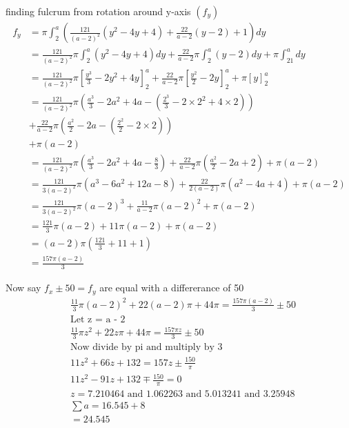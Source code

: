 \documentclass{article}
\begin{document}
finding fulcrum from rotation around y-axis $(f_y)$
\begin{align*}
    f_y &= \pi\int^a_2 \left(\frac{121}{(a-2)^2}(y^2-4y+4) 
         + \frac{22}{a-2}(y-2) 
         + 1 \right)dy\\
        & = \frac{121}{(a-2)^2}\pi\int^a_2(y^2-4y+4)dy + \frac{22}{a-2}\pi\int^a_2(y-2)dy + \pi\int^a_21dy\\
        & = \frac{121}{(a-2)^2}\pi\left[\frac{y^3}{3}-2y^2+4y\right]^a_2
          + \frac{22}{a-2}\pi\left[\frac{y^2}{2}-2y\right]^a_2
          + \pi\left[y\right]^a_2\\
        & = \frac{121}{(a-2)^2}\pi\left(\frac{a^3}{3}-2a^2+4a - 
            \left( \frac{2^3}{3}-2\times2^2+4\times2\right)\right)\\
        & + \frac{22}{a-2}\pi\left(\frac{a^2}{2}-2a - \left( \frac{2^2}{2} - 2\times2\right)\right)\\
        & + \pi\left(a - 2\right)\\
        & = \frac{121}{(a-2)^2}\pi\left(\frac{a^3}{3}-2a^2+4a-\frac{8}{3}\right)
          + \frac{22}{a-2}\pi\left(\frac{a^2}{2}-2a+2\right)
          + \pi\left(a - 2\right)\\
        & = \frac{121}{3(a-2)^2}\pi\left( a^3 - 6a^2 + 12a - 8 \right) 
        + \frac{22}{2(a-2)}\pi(a^2 - 4a + 4)
        + \pi(a-2)\\
        & = \frac{121}{3(a-2)^2}\pi(a-2)^3
        + \frac{11}{a-2}\pi(a-2)^2
        + \pi(a-2)\\
        & = \frac{121}{3}\pi(a-2)
        + 11\pi(a-2)
        + \pi(a-2)\\
        & = (a-2)\pi\left( \frac{121}{3} + 11 + 1 \right)\\
        & = \frac{157\pi(a-2)}{3}
\end{align*}

Now say $f_x \pm 50 = f_y$ are equal with a differerance of 50
\begin{align*}
    & \frac{11}{3}\pi(a-2)^2 + 22(a-2)\pi + 44\pi
    = \frac{157\pi(a-2)}{3} \pm 50\\
    &\text{Let z = a - 2}\\
    & \frac{11}{3}\pi z^2 + 22z\pi + 44\pi
    = \frac{157\pi z}{3} \pm 50\\
    &\text{Now divide by pi and multiply by 3}\\
    & 11z^2 + 66z + 132
    = 157z \pm \frac{150}{\pi}\\
    & 11z^2 -91z + 132 \mp  \frac{150}{\pi} = 0\\
    & z = 7.210464 \text{ and } 1.062263
    \text{ and } 5.013241 \text{ and } 3.25948\\
    & \sum a = 16.545 + 8\\
    & = 24.545
\end{align*}
\end{document}
